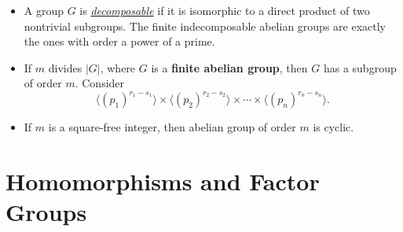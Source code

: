 \documentclass{article}
\newcommand{\df}[1]{\ul{\textit{#1}}}
\begin{document}
\begin{itemize}
    \item A group $G$ is \df{decomposable} if it is isomorphic to a direct product of two nontrivial subgroups. The finite indecomposable abelian groups are exactly the ones with order a power of a prime.
    \item If $m$ divides $|G|$, where $G$ is a \textbf{finite abelian group}, then $G$ has a subgroup of order $m$. Consider $$\langle (p_1)^{r_1 - s_1} \rangle \times \langle (p_2)^{r_2 - s_2} \rangle \times \cdots \times \langle (p_n)^{r_n - s_n} \rangle.$$
    \item If $m$ is a square-free integer, then abelian group of order $m$ is cyclic.
\end{itemize}

\section{Homomorphisms and Factor Groups}
\end{document}
